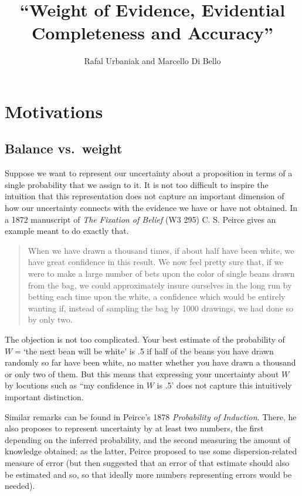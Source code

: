 \documentclass[
  10pt,
  dvipsnames,enabledeprecatedfontcommands]{scrartcl}
\title{``Weight of Evidence, Evidential Completeness and Accuracy''}
\author{Rafal Urbaniak and Marcello Di Bello}
\date{}
\begin{document}
\maketitle

\hypertarget{motivations}{%
\section{Motivations}\label{motivations}}

\hypertarget{balance-vs.-weight}{%
\subsection{Balance vs.~weight}\label{balance-vs.-weight}}

Suppose we want to represent our uncertainty about a proposition in
terms of a single probability that we assign to it. It is not too
difficult to inspire the intuition that this representation does not
capture an important dimension of how our uncertainty connects with the
evidence we have or have not obtained. In a 1872 manuscript of
\emph{The Fixation of Belief} (W3 295) C. S. Peirce gives an example
meant to do exactly that.

\begin{quote} When we have drawn a thousand times, if about half have been white, we have great confidence in this result. We now feel pretty sure that, if we were to make a large number of bets upon the color of single beans drawn from the bag, we could approximately insure ourselves in the long run by betting each time upon the white, a confidence which would be entirely wanting if, instead of sampling the bag by 1000 drawings, we had done so by only two.
\end{quote}

\noindent The objection is not too complicated. Your best estimate of
the probability of \(W=\)`the next bean will be white' is .5 if half of
the beans you have drawn randomly so far have been white, no matter
whether you have drawn a thousand or only two of them. But this means
that expressing your uncertainty about \(W\) by locutions such as ``my
confidence in \(W\) is .5' does not capture this intuitively important
distinction.

Similar remarks can be found in Peirce's 1878
\emph{Probability of Induction}. There, he also proposes to represent
uncertainty by at least two numbers, the first depending on the inferred
probability, and the second measuring the amount of knowledge obtained;
as the latter, Peirce proposed to use some dispersion-related measure of
error (but then suggested that an error of that estimate should also be
estimated and so, so that ideally more numbers representing errors would
be needed).
\end{document}
